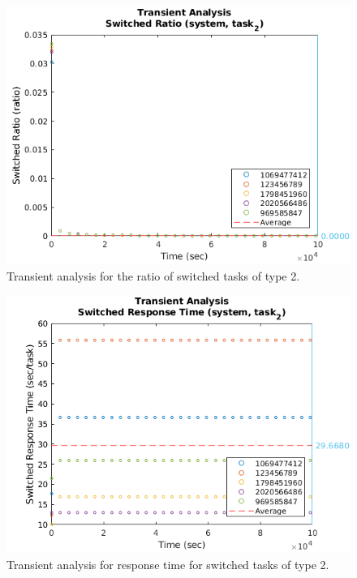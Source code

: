\begin{figure}
	\includegraphics[width=\columnwidth]{fig/evaluation-transient-analysis-switched-ratio}
	\caption{Transient analysis for the ratio of switched tasks of type 2.}
	\label{fig:evaluation-transient-analysis-switched-ratio}
\end{figure}

\begin{figure}
	\includegraphics[width=\columnwidth]{fig/evaluation-transient-analysis-switched-response-time}
	\caption{Transient analysis for response time for switched tasks of type 2.}
	\label{fig:evaluation-transient-analysis-switched-response-time}
\end{figure}


